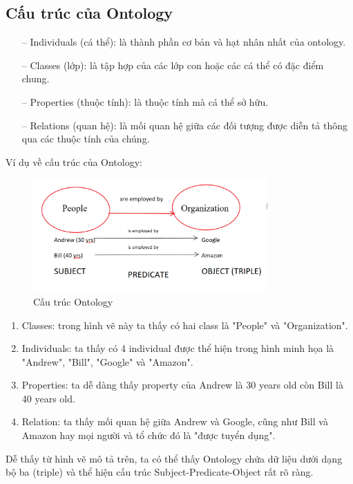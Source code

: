 \documentclass{article}
\begin{document}
\subsection{Cấu trúc của Ontology}
\begin{itemize}
    \item[--] Individuals (cá thể): là thành phần cơ bản và hạt nhân nhất của ontology.
    \item[--] Classes (lớp): là tập hợp của các lớp con hoặc các cá thể có đặc điểm chung.
    \item[--] Properties (thuộc tính): là thuộc tính mà cá thể sở hữu.
    \item[--] Relations (quan hệ): là mối quan hệ giữa các đối tượng được diễn tả thông qua các thuộc tính của chúng.
\end{itemize}
Ví dụ về cấu trúc của Ontology:
\begin{figure}[ht]
    \centering
    \includegraphics[width=0.8\textwidth]{ontology.png}
    \caption{Cấu trúc Ontology}
    \label{dongco}
\end{figure}
\newpage
\begin{enumerate}
    \item Classes: trong hình vẽ này ta thấy có hai class là "People" và "Organization".
    \item Individuals: ta thấy có 4 individual được thể hiện trong hình minh họa là "Andrew", "Bill", "Google" và "Amazon".
    \item Properties: ta dễ dàng thấy property của Andrew là 30 years old còn Bill là 40 years old.
    \item Relation: ta thấy mối quan hệ giữa Andrew và Google, cũng như Bill và Amazon hay mọi người và tổ chức đó là "được tuyển dụng".
\end{enumerate}
Dễ thấy từ hình vẽ mô tả trên, ta có thể thấy Ontology chứa dữ liệu dưới dạng bộ ba (triple) và thể hiện cấu trúc Subject-Predicate-Object rất rõ ràng.
\end{document}
